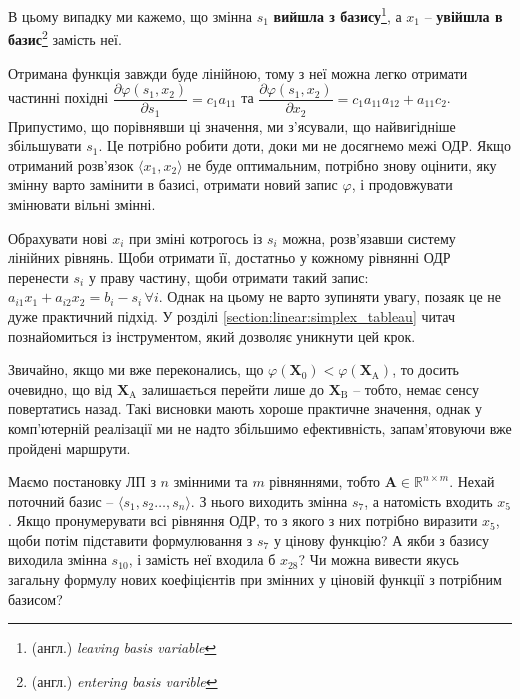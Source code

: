 \documentclass[\main/book.tex]{subfiles}
\begin{document}
В цьому випадку ми кажемо, що змінна $s_1$ \textbf{вийшла з базису}\footnote{(англ.) \textit{leaving basis variable}}, а $x_1$ -- \textbf{увійшла в базис}\footnote{(англ.) \textit{entering basis varible}} замість неї.

Отримана функція завжди буде лінійною, тому з неї можна легко отримати частинні похідні $\dfrac{\partial \varphi(s_1, x_2)}{\partial s_1} = c_1 a_{11}$ та $\dfrac{\partial \varphi(s_1, x_2)}{\partial x_2} = c_1 a_{11} a_{12} + a_{11} c_2$. Припустимо, що порівнявши ці значення, ми з'ясували, що найвигідніше збільшувати $s_1$. Це потрібно робити доти, доки ми не досягнемо межі ОДР. Якщо отриманий розв'язок ${\langle x_1, x_2 \rangle}$ не буде оптимальним, потрібно знову оцінити, яку змінну варто замінити в базисі, отримати новий запис $\varphi$, і продовжувати змінювати вільні змінні.

\begin{note}
 Обрахувати нові $x_i$ при зміні котрогось із $s_i$ можна, розв'язавши систему лінійних рівнянь. Щоби отримати її, достатньо у кожному рівнянні ОДР перенести $s_i$ у праву частину, щоби отримати такий запис: $a_{i1} x_1 + a_{i2} x_2 = b_i - s_i \, \forall i$. Однак на цьому не варто зупиняти увагу, позаяк це не дуже практичний підхід. У розділі \ref{section:linear:simplex_tableau} читач познайомиться із інструментом, який дозволяє уникнути цей крок.
\end{note}

\begin{note}
 Звичайно, якщо ми вже переконались, що ${\varphi(\mathbf{X}_0) < \varphi(\mathbf{X}_\mathrm{A})}$, то досить очевидно, що від $\mathbf{X}_\mathrm{A}$ залишається перейти лише до $\mathbf{X}_\mathrm{B}$ -- тобто, немає сенсу повертатись назад. Такі висновки мають хороше практичне значення, однак у комп'ютерній реалізації ми не надто збільшимо ефективність, запам'ятовуючи вже пройдені маршрути.
\end{note}

\begin{question}
 Маємо постановку ЛП з $n$ змінними та $m$ рівняннями, тобто $\mathbf{A} \in \mathbb{R}^{n \times m}$. Нехай поточний базис -- $\langle s_1, s_2 \ldots, s_n \rangle$. З нього виходить змінна $s_7$, а натомість входить $x_5$. Якщо пронумерувати всі рівняння ОДР, то з якого з них потрібно виразити $x_5$, щоби потім підставити формулювання з $s_7$ у цінову функцію? А якби з базису виходила змінна $s_{10}$, і замість неї входила б $x_{28}$? Чи можна вивести якусь загальну формулу нових коефіцієнтів при змінних у ціновій функції з потрібним базисом?
\end{question}
\end{document}
